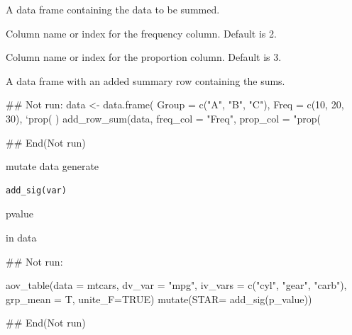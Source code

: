 \documentclass[a4paper]{book}
\begin{document}
%
\begin{Arguments}
\begin{ldescription}
\item[\code{df}] A data frame containing the data to be summed.

\item[\code{freq\_col}] Column name or index for the frequency column. Default is 2.

\item[\code{prop\_col}] Column name or index for the proportion column. Default is 3.
\end{ldescription}
\end{Arguments}
%
\begin{Value}
A data frame with an added summary row containing the sums.
\end{Value}
%
\begin{Examples}
\begin{ExampleCode}
\#\# Not run: 
data <- data.frame(
  Group = c("A", "B", "C"),
  Freq = c(10, 20, 30),
  `prop(%
)
add_row_sum(data, freq_col = "Freq", prop_col = "prop(%

## End(Not run)
\end{ExampleCode}
\end{Examples}
%
\begin{Description}
mutate data generate
\end{Description}
%
\begin{Usage}
\begin{verbatim}
add_sig(var)
\end{verbatim}
\end{Usage}
%
\begin{Arguments}
\begin{ldescription}
\item[\code{p.value}] pvalue
\end{ldescription}
\end{Arguments}
%
\begin{Value}
in data
\end{Value}
%
\begin{Examples}
\begin{ExampleCode}

\#\# Not run: 

aov_table(data = mtcars, dv_var = "mpg",
iv_vars = c("cyl", "gear", "carb"), grp_mean = T,
unite_F=TRUE) %
 mutate(STAR= add_sig(p_value))


## End(Not run)
\end{ExampleCode}
\end{Examples}
\end{document}
